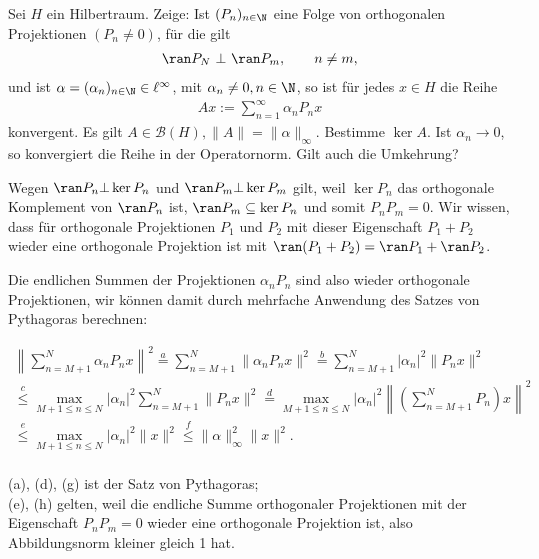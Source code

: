\begin{exercise}
Sei $H$ ein Hilbertraum. Zeige: Ist $(P_n)_{n \in \N}$ eine Folge von orthogonalen
Projektionen $(P_n \neq 0)$, für die gilt
\begin{align*}
  \ran P_N ~\bot~ \ran P_m, \qquad n \neq m,
\end{align*}
und ist $\alpha = (\alpha_n)_{n \in \N} \in \ell^{\infty}$, mit $\alpha_n \neq 0, n \in \N$,
so ist für jedes $x \in H$ die Reihe
\begin{align*}
  Ax := \sum_{n=1}^{\infty} \alpha_n P_n x
\end{align*}
konvergent. Es gilt $A \in \mathcal{B}(H), \|A\| = \|\alpha\|_{\infty}$. Bestimme
$\ker A$. Ist $\alpha_n \to 0$, so konvergiert die Reihe in der Operatornorm.
Gilt auch die Umkehrung?
\end{exercise}
\begin{solution}
  Wegen $\ran P_n \bot \ker P_n$ und $\ran P_m \bot \ker P_m$ gilt, weil $\ker P_n$ das orthogonale Komplement von $\ran P_n$ ist, $\ran P_m \subseteq \ker P_n$ und somit $P_n P_m = 0.$ Wir wissen, dass für orthogonale Projektionen $P_1$ und $P_2$ mit dieser Eigenschaft $P_1 + P_2$ wieder eine orthogonale Projektion ist mit $\ran (P_1 + P_2) = \ran P_1 + \ran P_2$.

  Die endlichen Summen der Projektionen $\alpha_n P_n$ sind also wieder orthogonale Projektionen, wir können damit durch mehrfache Anwendung des Satzes von Pythagoras berechnen:

  \begin{align}
      \left\| \sum_{n = M+1}^N \alpha_n P_n x \right\|^2 \stackrel{a}{=} \sum_{n = M+1}^N \| \alpha_n P_n x \|^2 \stackrel{b}{=} \sum_{n = M+1}^N | \alpha_n|^2 \| P_n x \|^2 \\
      \stackrel{c}{\leq} \max_{M+1 \leq n \leq N} |\alpha_n|^2 \sum_{n = M+1}^N \| P_n x \|^2 \stackrel{d}{=}
      \max_{M+1 \leq n \leq N} |\alpha_n|^2 \left\| \left(\sum_{n = M+1}^N P_n\right) x \right\|^2 \\ \stackrel{e}{\leq}
      \max_{M+1 \leq n \leq N} |\alpha_n|^2 \|x\|^2
      \stackrel{f}{\leq} \| \alpha \|_{\infty}^2 \| x \|^2.
  \end{align}
  \\
  (a), (d), (g) ist der Satz von Pythagoras; \\
  (e), (h) gelten, weil die endliche Summe orthogonaler Projektionen mit der Eigenschaft $P_n P_m = 0$ wieder eine orthogonale Projektion ist, also Abbildungsnorm kleiner gleich 1 hat.


\end{solution}
